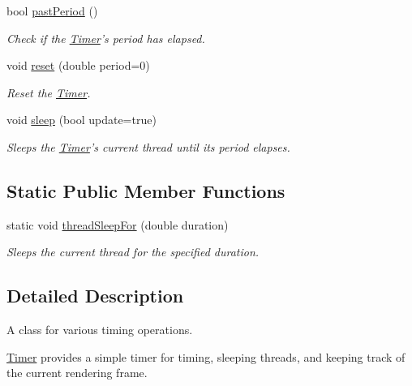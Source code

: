 \begin{DoxyCompactItemize}
bool \hyperlink{classtsgl_1_1_timer_ac7c908b06a735f09841367c7067f44dd}{past\-Period} ()
\begin{DoxyCompactList}\small\item\em \-Check if the \hyperlink{classtsgl_1_1_timer}{\-Timer}'s period has elapsed. \end{DoxyCompactList}\item 
void \hyperlink{classtsgl_1_1_timer_a67a01c03c033c52056b7f1c733cd93e4}{reset} (double period=0)
\begin{DoxyCompactList}\small\item\em \-Reset the \hyperlink{classtsgl_1_1_timer}{\-Timer}. \end{DoxyCompactList}\item 
void \hyperlink{classtsgl_1_1_timer_a5c6e0dca6793d48c675e05b983da7f07}{sleep} (bool update=true)
\begin{DoxyCompactList}\small\item\em \-Sleeps the \hyperlink{classtsgl_1_1_timer}{\-Timer}'s current thread until its period elapses. \end{DoxyCompactList}\end{DoxyCompactItemize}
\subsection*{\-Static \-Public \-Member \-Functions}
\begin{DoxyCompactItemize}
\item 
static void \hyperlink{classtsgl_1_1_timer_ae8c5b39a6c5cae2a24abe2a298b05b64}{thread\-Sleep\-For} (double duration)
\begin{DoxyCompactList}\small\item\em \-Sleeps the current thread for the specified duration. \end{DoxyCompactList}\end{DoxyCompactItemize}


\subsection{\-Detailed \-Description}
\-A class for various timing operations. 

\hyperlink{classtsgl_1_1_timer}{\-Timer} provides a simple timer for timing, sleeping threads, and keeping track of the current rendering frame. 

